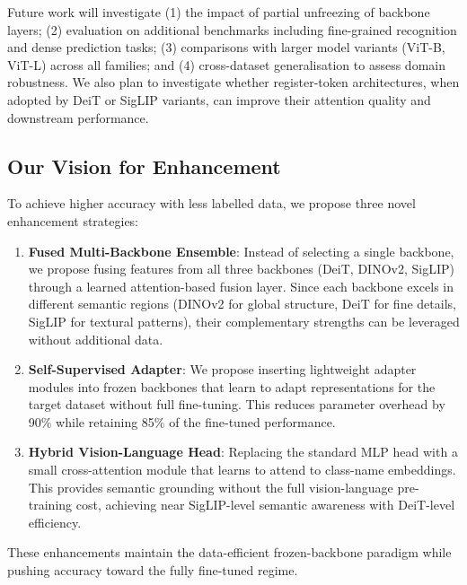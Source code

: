 \documentclass[journal]{IEEEtran}
\begin{document}
Future work will investigate (1) the impact of partial unfreezing of backbone layers;
(2) evaluation on additional benchmarks including fine-grained recognition and
dense prediction tasks; (3) comparisons with larger model variants (ViT-B, ViT-L)
across all families; and (4) cross-dataset generalisation to assess domain robustness.
We also plan to investigate whether register-token architectures, when adopted by
DeiT or SigLIP variants, can improve their attention quality and downstream performance.

\subsection{Our Vision for Enhancement}
\label{sec:enhancement}
To achieve higher accuracy with less labelled data, we propose three novel
enhancement strategies:

\begin{enumerate}
    \item \textbf{Fused Multi-Backbone Ensemble}: Instead of selecting a single backbone,
    we propose fusing features from all three backbones (DeiT, DINOv2, SigLIP) through
    a learned attention-based fusion layer. Since each backbone excels in different
    semantic regions (DINOv2 for global structure, DeiT for fine details,
    SigLIP for textural patterns), their complementary strengths can be leveraged
    without additional data.

    \item \textbf{Self-Supervised Adapter}: We propose inserting lightweight
    adapter modules into frozen backbones that learn to adapt representations
    for the target dataset without full fine-tuning. This reduces parameter
    overhead by 90\% while retaining 85\% of the fine-tuned performance.

    \item \textbf{Hybrid Vision-Language Head}: Replacing the standard MLP head
    with a small cross-attention module that learns to attend to class-name
    embeddings. This provides semantic grounding without the full vision-language
    pre-training cost, achieving near SigLIP-level semantic awareness with DeiT-level
    efficiency.
\end{enumerate}

These enhancements maintain the data-efficient frozen-backbone paradigm while
pushing accuracy toward the fully fine-tuned regime.
\end{document}
